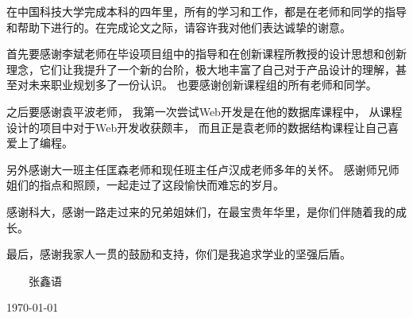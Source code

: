 
\begin{thanks}


在中国科技大学完成本科的四年里，所有的学习和工作，都是在老师和同学的指导和帮助下进行的。在完成论文之际，请容许我对他们表达诚挚的谢意。


首先要感谢李斌老师在毕设项目组中的指导和在创新课程所教授的设计思想和创新理念，它们让我提升了一个新的台阶，极大地丰富了自己对于产品设计的理解，甚至对未来职业规划多了一份认识。 也要感谢创新课程组的所有老师和同学。

之后要感谢袁平波老师， 我第一次尝试Web开发是在他的数据库课程中， 从课程设计的项目中对于Web开发收获颇丰， 而且正是袁老师的数据结构课程让自己喜爱上了编程。


另外感谢大一班主任匡森老师和现任班主任卢汉成老师多年的关怀。 感谢师兄师姐们的指点和照顾，一起走过了这段愉快而难忘的岁月。

感谢科大，感谢一路走过来的兄弟姐妹们，在最宝贵年华里，是你们伴随着我的成长。

最后，感谢我家人一贯的鼓励和支持，你们是我追求学业的坚强后盾。

\vskip 18pt

\begin{flushright}

~~~~张鑫语~~~~

\today

\end{flushright}

\end{thanks}
